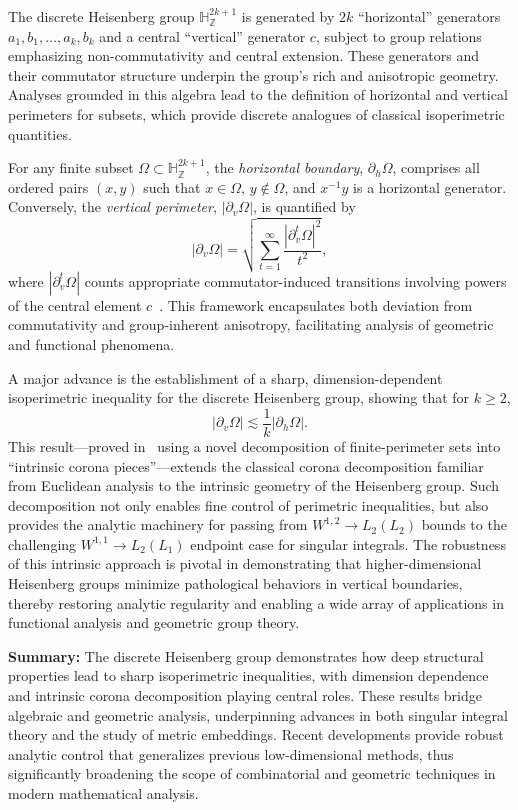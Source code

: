\documentclass[sigconf]{acmart}
\begin{document}
The discrete Heisenberg group $\mathbb{H}_{\mathbb{Z}}^{2k+1}$ is generated by $2k$ ``horizontal'' generators $a_1, b_1, \ldots, a_k, b_k$ and a central ``vertical'' generator $c$, subject to group relations emphasizing non-commutativity and central extension. These generators and their commutator structure underpin the group's rich and anisotropic geometry. Analyses grounded in this algebra lead to the definition of horizontal and vertical perimeters for subsets, which provide discrete analogues of classical isoperimetric quantities.

For any finite subset $\Omega \subset \mathbb{H}_{\mathbb{Z}}^{2k+1}$, the \emph{horizontal boundary}, $\partial_{h}\Omega$, comprises all ordered pairs $(x, y)$ such that $x \in \Omega$, $y \notin \Omega$, and $x^{-1}y$ is a horizontal generator. Conversely, the \emph{vertical perimeter}, $|\partial_{v} \Omega|$, is quantified by 
\[
|\partial_{v} \Omega| = \sqrt{\sum_{t=1}^{\infty} \frac{|\partial^{t}_{v}\Omega|^2}{t^2}},
\]
where $|\partial^{t}_{v}\Omega|$ counts appropriate commutator-induced transitions involving powers of the central element $c$~\cite{ref108}. This framework encapsulates both deviation from commutativity and group-inherent anisotropy, facilitating analysis of geometric and functional phenomena.

A major advance is the establishment of a sharp, dimension-dependent isoperimetric inequality for the discrete Heisenberg group, showing that for $k \geq 2$,
\[
|\partial_{v}\Omega| \lesssim \frac{1}{k} |\partial_{h}\Omega|.
\]
This result---proved in~\cite{ref108} using a novel decomposition of finite-perimeter sets into ``intrinsic corona pieces''---extends the classical corona decomposition familiar from Euclidean analysis to the intrinsic geometry of the Heisenberg group. Such decomposition not only enables fine control of perimetric inequalities, but also provides the analytic machinery for passing from $W^{1,2} \to L_2(L_2)$ bounds to the challenging $W^{1,1} \to L_2(L_1)$ endpoint case for singular integrals. The robustness of this intrinsic approach is pivotal in demonstrating that higher-dimensional Heisenberg groups minimize pathological behaviors in vertical boundaries, thereby restoring analytic regularity and enabling a wide array of applications in functional analysis and geometric group theory.

\textbf{Summary:} The discrete Heisenberg group demonstrates how deep structural properties lead to sharp isoperimetric inequalities, with dimension dependence and intrinsic corona decomposition playing central roles. These results bridge algebraic and geometric analysis, underpinning advances in both singular integral theory and the study of metric embeddings. Recent developments provide robust analytic control that generalizes previous low-dimensional methods, thus significantly broadening the scope of combinatorial and geometric techniques in modern mathematical analysis.
\end{document}
